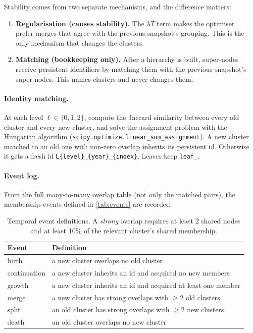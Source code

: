 \documentclass[11pt,a4paper]{article}
\newcommand{\cref}[1]{\autoref{#1}}
\theoremstyle{remark}
\newcommand{\code}[1]{\texttt{\small #1}}
\begin{document}
Stability comes from two separate mechanisms, and the difference matters:

\begin{enumerate}
  \item \textbf{Regularisation (causes stability).} The $\lambda T$ term makes the
        optimiser prefer merges that agree with the previous snapshot's grouping. This is
        the only mechanism that changes the clusters.
  \item \textbf{Matching (bookkeeping only).} After a hierarchy is built, super-nodes
        receive persistent identifiers by matching them with the previous snapshot's
        super-nodes. This names clusters and never changes them.
\end{enumerate}

\paragraph{Identity matching.}
At each level $\ell\in\{0,1,2\}$, compute the Jaccard similarity between every old
cluster and every new cluster, and solve the assignment problem with the Hungarian
algorithm (\code{scipy.optimize.linear\_sum\_assignment}). A new cluster matched to an
old one with non-zero overlap inherits its persistent id. Otherwise it gets a fresh id
\code{L\{level\}\_\{year\}\_\{index\}}. Leaves keep \code{leaf\_<node id>}.

\paragraph{Event log.}
From the full many-to-many overlap table (not only the matched pairs), the membership
events defined in \cref{tab:events} are recorded.

\begin{table}[!htbp]
\centering
\caption{Temporal event definitions. A \emph{strong} overlap requires at least 2 shared
nodes and at least 10\% of the relevant cluster's shared membership.}
\label{tab:events}
\begin{tabularx}{\linewidth}{lX}
\toprule
Event & Definition\\
\midrule
birth & a new cluster overlaps no old cluster\\
continuation & a new cluster inherits an id and acquired no new members\\
growth & a new cluster inherits an id and acquired at least one member\\
merge & a new cluster has strong overlaps with $\ge2$ old clusters\\
split & an old cluster has strong overlaps with $\ge2$ new clusters\\
death & an old cluster overlaps no new cluster\\
\bottomrule
\end{tabularx}
\end{table}
\end{document}
